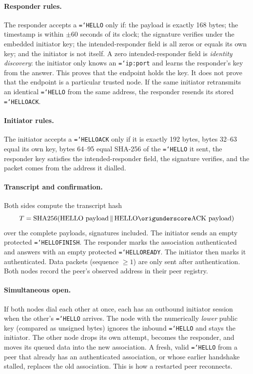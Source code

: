 \documentclass[11pt,a4paper]{article}
\newcommand{\code}[1]{\texttt{\hyphenchar\font=`\-\relax #1}}
\DeclareRobustCommand{\_}{\origunderscore\allowbreak}
\begin{document}
\paragraph{Responder rules.} The responder accepts a \code{HELLO} only if: the payload is
exactly 168 bytes; the timestamp is within $\pm 60$ seconds of its clock; the signature
verifies under the embedded initiator key; the intended-responder field is all zeros or equals
its own key; and the initiator is not itself. A zero intended-responder field is
\emph{identity discovery}: the initiator only knows an \code{ip:port} and learns the
responder's key from the answer. This proves that the endpoint holds the key. It does not
prove that the endpoint is a particular trusted node. If the same initiator retransmits an
identical \code{HELLO} from the same address, the responder resends its stored
\code{HELLO\_ACK}.

\paragraph{Initiator rules.} The initiator accepts a \code{HELLO\_ACK} only if it is exactly
192 bytes, bytes 32--63 equal its own key, bytes 64--95 equal SHA-256 of the \code{HELLO} it
sent, the responder key satisfies the intended-responder field, the signature verifies, and
the packet comes from the address it dialled.

\paragraph{Transcript and confirmation.} Both sides compute the transcript hash
\[ T = \mathrm{SHA256}(\text{HELLO payload} \,\Vert\, \text{HELLO\_ACK payload}) \]
over the complete payloads, signatures included. The initiator sends an empty protected
\code{HELLO\_FINISH}. The responder marks the association authenticated and answers with an
empty protected \code{HELLO\_READY}. The initiator then marks it authenticated. Data packets
(sequence $\ge 1$) are only sent after authentication. Both nodes record the peer's observed
address in their peer registry.

\paragraph{Simultaneous open.} If both nodes dial each other at once, each has an outbound
initiator session when the other's \code{HELLO} arrives. The node with the numerically
\emph{lower} public key (compared as unsigned bytes) ignores the inbound \code{HELLO} and
stays the initiator. The other node drops its own attempt, becomes the responder, and moves
its queued data into the new association. A fresh, valid \code{HELLO} from a peer that already
has an authenticated association, or whose earlier handshake stalled, replaces the old
association. This is how a restarted peer reconnects.
\end{document}
